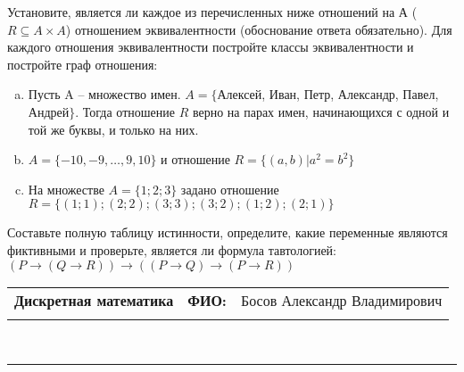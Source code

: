 \documentclass[10pt]{exam}
\newcommand{\class}{Дискретная математика}
\newcommand{\examdate}{}
\begin{document}
\begin{questions}
\question
Установите, является ли каждое из перечисленных ниже отношений на А ($R \subseteq A \times A$) отношением эквивалентности (обоснование ответа обязательно). Для каждого отношения эквивалентности постройте классы 
эквивалентности и постройте граф отношения:
\begin{enumerate} [a)]\setcounter{enumi}{0}
\item Пусть A – множество имен. $A = \{ $Алексей, Иван, Петр, Александр, Павел, Андрей$ \}$. Тогда отношение $R$ верно на парах имен, начинающихся с одной и той же буквы, и только на них.
\item $A = \{-10, -9, … , 9, 10\}$ и отношение $ R = \{(a,b)|a^{2} = b^{2}\}$
\item На множестве $A = \{1; 2; 3\}$ задано отношение $R = \{(1; 1); (2; 2); (3; 3); (3; 2); (1; 2); (2; 1)\}$
\end{enumerate}\question Составьте полную таблицу истинности, определите, какие переменные являются фиктивными и проверьте, является ли формула тавтологией:
$(P \rightarrow (Q \rightarrow R)) \rightarrow ((P \rightarrow Q) \rightarrow (P \rightarrow R))$

\end{questions}
\newpage
\begin{flushright}
\begin{tabular}{p{2.8in} r l}
\textbf{\class} & \textbf{ФИО:} &Босов Александр Владимирович
\\

\textbf{\examdate} &&\\
\end{tabular}\\
\end{flushright}
\rule[1ex]{\textwidth}{.1pt}
\end{document}
